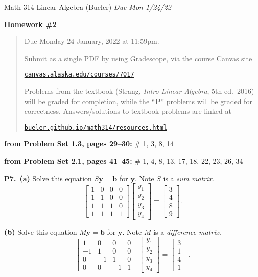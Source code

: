 \documentclass[12pt]{amsart}
\newcommand{\bb}{\bm{b}}
\newcommand{\by}{\bm{y}}
\newcommand{\prob}[1]{\bigskip\noindent\textbf{#1}\quad }
\newcommand{\probset}[2]{\prob{from Problem Set #1, pages #2:}}
\newcommand{\epart}[1]{\medskip\noindent\textbf{(#1)}\quad }
\newcommand{\ppart}[1]{\,\textbf{(#1)}\quad }
\begin{document}
\scriptsize \noindent Math 314 Linear Algebra (Bueler) \hfill \emph{Due Mon 1/24/22}
\normalsize\medskip

\Large
\centerline{\textbf{Homework \#2}}

\normalsize
\bigskip
\begin{quote}
Due Monday 24 January, 2022 at 11:59pm.

\medskip
\noindent Submit as a single PDF by using Gradescope, via the course Canvas site

\href{https://canvas.alaska.edu/courses/7017}{\texttt{canvas.alaska.edu/courses/7017}}

\noindent Problems from the textbook (Strang, \emph{Intro Linear Algebra}, 5th ed.~2016) will be graded for completion, while the ``\textbf{P}'' problems will be graded for correctness.  Answers/solutions to textbook problems are linked at

\href{https://bueler.github.io/math314/resources.html}{\texttt{bueler.github.io/math314/resources.html}}
\end{quote}
\medskip

\thispagestyle{empty}

\bigskip

\probset{1.3}{29--30} \# 1, 3, 8, 14

\probset{2.1}{41--45} \# 1, 4, 8, 13, 17, 18, 22, 23, 26, 34

\prob{P7.}  \ppart{a} Solve this equation $S \by = \bb$ for $\by$.  Note $S$ is a \emph{sum matrix}.
    $$\begin{bmatrix} 1 & 0 & 0 & 0 \\ 1 & 1 & 0 & 0 \\ 1 & 1 & 1 & 0 \\ 1 & 1 & 1 & 1 \end{bmatrix} \begin{bmatrix} y_1 \\ y_2 \\ y_3 \\ y_4 \end{bmatrix} = \begin{bmatrix} 3 \\ 4 \\ 8 \\ 9 \end{bmatrix}.$$

\epart{b} Solve this equation $M \by = \bb$ for $\by$.  Note $M$ is a \emph{difference matrix}.
    $$\begin{bmatrix} 1 & 0 & 0 & 0 \\ -1 & 1 & 0 & 0 \\ 0 & -1 & 1 & 0 \\ 0 & 0 & -1 & 1 \end{bmatrix} \begin{bmatrix} y_1 \\ y_2 \\ y_3 \\ y_4 \end{bmatrix} = \begin{bmatrix} 3 \\ 1 \\ 4 \\ 1 \end{bmatrix}.$$
\end{document}
